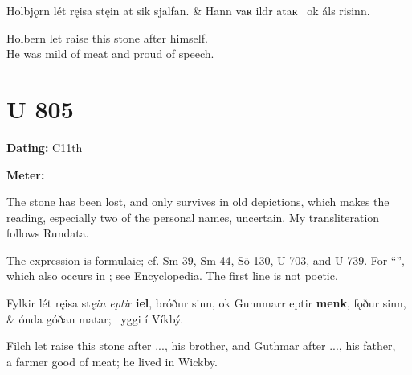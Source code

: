\sectionline

\bvg\bva[]%
Holbjǫrn lét ręisa stęin at sik sjalfan. &
Hann vaʀ ildr ataʀ \hld\ ok áls risinn.\eva

\bvb Holbern let raise this stone after himself. \\
He was mild of meat and proud of speech.\evb\evg

\sectionline

\section{U 805}

\begin{flushright}%
\textbf{Dating: }C11th

\textbf{Meter: }\Fornyrdislag
\end{flushright}%

The stone has been lost, and only survives in old depictions, which makes the reading, especially two of the personal names, uncertain.  My transliteration follows Rundata.

The expression is formulaic; cf. Sm 39, Sm 44, Sö 130, U 703, and U 739.  For “”, which also occurs in \Havamal; see Encyclopedia.  The first line is not poetic.

\sectionline

\bvg\bva[]%
Fylkir lét ręisa st\emph{ęin epti}r \textbf{iel}, bróður sinn, ok Gunnmarr eptir \textbf{menk}, fǫður sinn, &
ónda góðan matar; \hld\ yggi í Víkbý.\eva

\bvb Filch let raise this stone after ..., his brother, and Guthmar after ..., his father, \\
a farmer good of meat; he lived in Wickby.\evb\evg

\sectionline
